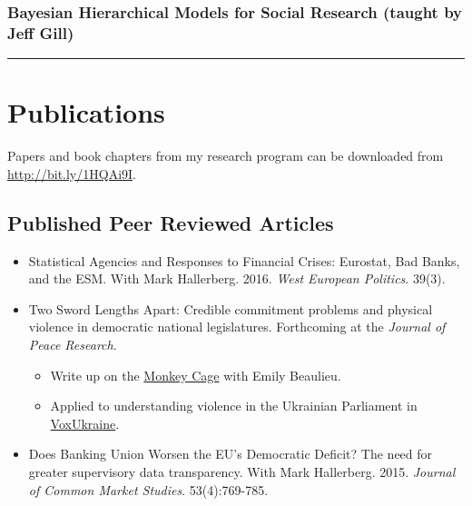 \documentclass[a4paper]{article}
\begin{document}
{\subsubsection*{Bayesian Hierarchical Models for Social Research (taught by Jeff Gill)}

\vspace{0.25cm}
\medskip\hrule height 1pt
\vspace{0.5cm}


\section*{Publications}

\noindent Papers and book chapters from my research program can be downloaded from {\url{http://bit.ly/1HQAi9I}}.

\subsection*{Published Peer Reviewed Articles}

\begin{itemize}

    \item Statistical Agencies and Responses to Financial Crises: Eurostat, Bad Banks, and the ESM. With Mark Hallerberg. 2016. {\emph{West European Politics}}. 39(3).

    \item Two Sword Lengths Apart: Credible commitment problems and physical violence in democratic national legislatures. Forthcoming at the \emph{Journal of Peace Research}.

        \begin{itemize}
            \item Write up on the \href{http://t.co/fETbFCXcYU}{Monkey Cage} with Emily Beaulieu.

            \item Applied to understanding violence in the Ukrainian Parliament in \href{http://voxukraine.org/2015/12/24/causes-and-possible-solutions-to-brawling-in-the-ukrainian-parliament-en-2/}{VoxUkraine}.
    \end{itemize}

    \item Does Banking Union Worsen the EU's Democratic Deficit? The need for greater supervisory data transparency. With Mark Hallerberg. 2015. {\emph{Journal of Common Market Studies}}. 53(4):769-785.


\end{itemize}}
\end{document}
